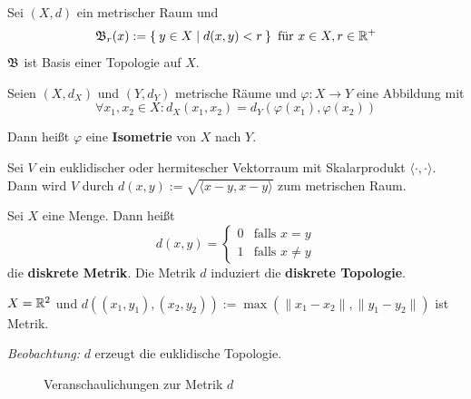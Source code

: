 \begin{bemerkung}
    Sei $(X, d)$ ein metrischer Raum und
    \[\mathfrak{B}_r(x) := \Set{y \in X | d(x,y) < r} \text{ für } x \in X, r \in \mathbb{R}^+\]
    $\mathfrak{B}$ ist Basis einer Topologie auf $X$.
\end{bemerkung}

\begin{definition}%
    Seien $(X, d_X)$ und $(Y, d_Y)$ metrische Räume und $\varphi: X \rightarrow Y$
    eine Abbildung mit 
    \[\forall x_1, x_2 \in X: d_X(x_1, x_2) = d_Y(\varphi(x_1), \varphi(x_2)) \]

    Dann heißt $\varphi$ eine \textbf{Isometrie} von $X$ nach $Y$.
\end{definition}

\begin{beispiel}
    Sei $V$ ein euklidischer oder hermitescher Vektorraum mit Skalarprodukt
    $\langle \cdot , \cdot \rangle$.
    Dann wird $V$ durch $d(x,y) := \sqrt{\langle x-y, x-y \rangle}$ zum metrischen Raum.
\end{beispiel}

\begin{beispiel}%
    Sei $X$ eine Menge. Dann heißt
    \[d(x,y) = \begin{cases}
    0 & \text{falls } x=y\\
    1 & \text{falls } x \neq y
    \end{cases}\]
    die \textbf{diskrete Metrik}. Die Metrik $d$ induziert die 
    \textbf{diskrete Topologie}.
\end{beispiel}

\begin{beispiel}
    $X = \mathbb{R}^2$ und $d\left ((x_1, y_1), (x_2, y_2)\right ) := \max(\|x_1 - x_2\|, \|y_1 - y_2\|)$
    ist Metrik.

    \emph{Beobachtung:} $d$ erzeugt die euklidische Topologie.

    \begin{figure}[ht]
        \centering
        \subfloat[$\fB_r(0)$]{
            
            \label{fig:open-square}
        }%
        \label{fig:metrik}
        \caption{Veranschaulichungen zur Metrik $d$}
    \end{figure}

\end{beispiel}

